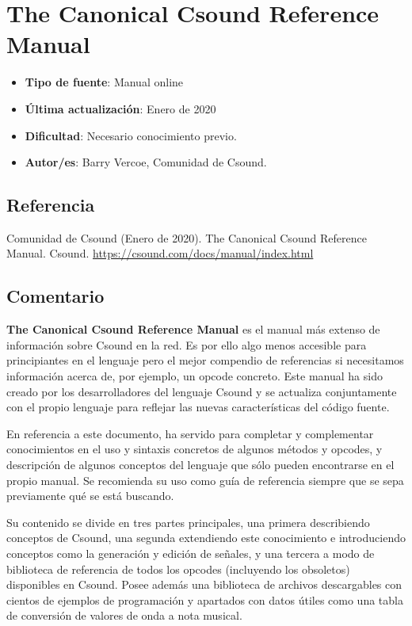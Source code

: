 \section{The Canonical Csound Reference Manual}

 \begin{itemize}
 \item \textbf{Tipo de fuente}: Manual online
 
 \item \textbf{Última actualización}: Enero de 2020
 
 \item \textbf{Dificultad}: Necesario conocimiento previo.
 
 \item \textbf{Autor/es}: Barry Vercoe, Comunidad de Csound.
 \end{itemize}

\subsection{Referencia}

Comunidad de Csound (Enero de 2020). The Canonical Csound Reference Manual. Csound. \url{https://csound.com/docs/manual/index.html}

\subsection{Comentario}

\textbf{The Canonical Csound Reference Manual} es el manual más extenso de información sobre Csound en la red. Es por ello algo menos accesible para principiantes en el lenguaje pero el mejor compendio de referencias si necesitamos información acerca de, por ejemplo, un opcode concreto. Este manual ha sido creado por los desarrolladores del lenguaje Csound y se actualiza conjuntamente con el propio lenguaje para reflejar las nuevas características del código fuente.

En referencia a este documento, ha servido para completar y complementar conocimientos en el uso y sintaxis concretos de algunos métodos y opcodes, y descripción de algunos conceptos del lenguaje que sólo pueden encontrarse en el propio manual.
Se recomienda su uso como guía de referencia siempre que se sepa previamente qué se está buscando.

Su contenido se divide en tres partes principales, una primera describiendo conceptos de Csound, una segunda extendiendo este conocimiento e introduciendo conceptos como la generación y edición de señales, y una tercera a modo de biblioteca de referencia de todos los opcodes (incluyendo los obsoletos) disponibles en Csound. Posee además una biblioteca de archivos descargables con cientos de ejemplos de programación y apartados con datos útiles como una tabla de conversión de valores de onda a nota musical.


